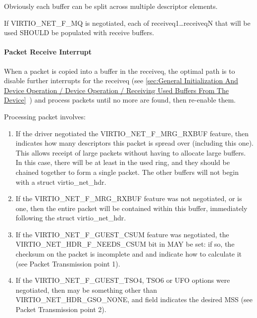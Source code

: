 \begin{note}
Obviously each buffer can be split across multiple descriptor elements.
\end{note}

If VIRTIO_NET_F_MQ is negotiated, each of receiveq1\ldots receiveqN
that will be used SHOULD be populated with receive buffers.

\paragraph{Packet Receive Interrupt}\label{sec:Device Types / Network Device / Device Operation / Setting Up Receive Buffers / Packet Receive Interrupt}

When a packet is copied into a buffer in the receiveq, the
optimal path is to disable further interrupts for the receiveq
(see \ref{sec:General Initialization And Device Operation / Device Operation / Receiving Used Buffers From The Device}~) and process
packets until no more are found, then re-enable them.

Processing packet involves:

\begin{enumerate}
\item If the driver negotiated the VIRTIO_NET_F_MRG_RXBUF feature,
  then  indicates how many descriptors
  this packet is spread over (including this one). This allows
  receipt of large packets without having to allocate large
  buffers. In this case, there will be at least  in
  the used ring, and they should be chained together to form a
  single packet. The other buffers will not begin with a struct
  virtio_net_hdr.

\item If the VIRTIO_NET_F_MRG_RXBUF feature was not negotiated, or
   is one, then the entire packet will be
  contained within this buffer, immediately following the struct
  virtio_net_hdr.

\item If the VIRTIO_NET_F_GUEST_CSUM feature was negotiated, the
  VIRTIO_NET_HDR_F_NEEDS_CSUM bit in  MAY be
  set: if so, the checksum on the packet is incomplete and
   and  indicate how to calculate
  it (see Packet Transmission point 1).

\item If the VIRTIO_NET_F_GUEST_TSO4, TSO6 or UFO options were
  negotiated, then  may be something other than
  VIRTIO_NET_HDR_GSO_NONE, and  field indicates the
  desired MSS (see Packet Transmission point 2).
\end{enumerate}

